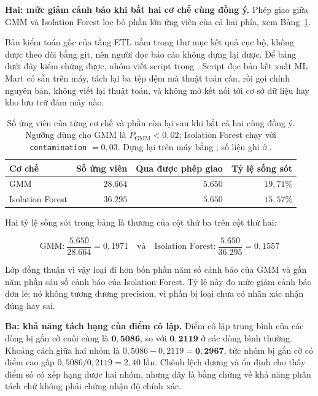 \textbf{Hai: mức giảm cảnh báo khi bắt hai cơ chế cùng đồng ý.} Phép giao giữa GMM và
Isolation Forest lọc bỏ phần lớn ứng viên của cả hai phía, xem Bảng~\ref{tab:song_sot_and}.

Bản kiểm toán gốc của tầng ETL nằm trong thư mục kết quả cục bộ, không được theo dõi bằng
git, nên người đọc báo cáo không dựng lại được. Để bảng dưới đây kiểm chứng được, nhóm viết
script  trong .
Script đọc bản kết xuất ML Mart có sẵn trên máy, tách lại ba tệp đệm mà thuật toán cần, rồi
gọi chính  nguyên bản, không viết lại thuật toán, và không mở kết nối
tới cơ sở dữ liệu hay kho lưu trữ đám mây nào.

\begin{table}[htbp]
\centering

\small
\begin{tabular}{l r r r}
\toprule
\textbf{Cơ chế} & \textbf{Số ứng viên} & \textbf{Qua được phép giao} & \textbf{Tỷ lệ sống sót} \\
\midrule
GMM              & $28.664$ & $5.650$ & $19{,}71\%$ \\
Isolation Forest & $36.295$ & $5.650$ & $15{,}57\%$ \\
\bottomrule
\end{tabular}
\caption[Số ứng viên của từng cơ chế và phần còn lại sau khi bắt cả hai cùng đồng ý]{Số ứng viên của từng cơ chế và phần còn lại sau khi bắt cả hai cùng đồng ý. Ngưỡng
dùng cho GMM là $P_{\text{GMM}} < 0{,}02$; Isolation Forest chạy với
\texttt{contamination} $= 0{,}03$. Dựng lại trên máy bằng
; số liệu ghi ở .}
\label{tab:song_sot_and}
\end{table}

Hai tỷ lệ sống sót trong bảng là thương của cột thứ ba trên cột thứ hai:

\begin{equation}
\text{GMM:}\ \frac{5.650}{28.664} = 0{,}1971 \quad\text{và}\quad
\text{Isolation Forest:}\ \frac{5.650}{36.295} = 0{,}1557
\end{equation}

Lớp đồng thuận vì vậy loại đi hơn bốn phần năm số cảnh báo của GMM và gần năm phần sáu số
cảnh báo của Isolation Forest. Tỷ lệ này đo mức giảm cảnh báo đơn lẻ; nó không tương
đương precision, vì phần bị loại chưa có nhãn xác nhận đúng hay sai.

\textbf{Ba: khả năng tách hạng của điểm cô lập.} Điểm cô lập trung bình của các dòng bị
gắn cờ cuối cùng là $\mathbf{0{,}5086}$, so với $\mathbf{0{,}2119}$ ở các dòng bình thường.
Khoảng cách giữa hai nhóm là $0{,}5086 - 0{,}2119 = \mathbf{0{,}2967}$, tức nhóm bị gắn cờ có
điểm cao gấp $0{,}5086 / 0{,}2119 = 2{,}40$ lần. Chênh lệch dương và ổn định cho thấy điểm số
có xếp hạng được hai nhóm, nhưng đây là bằng chứng về khả năng phân tách chứ không phải chứng
nhận độ chính xác.

